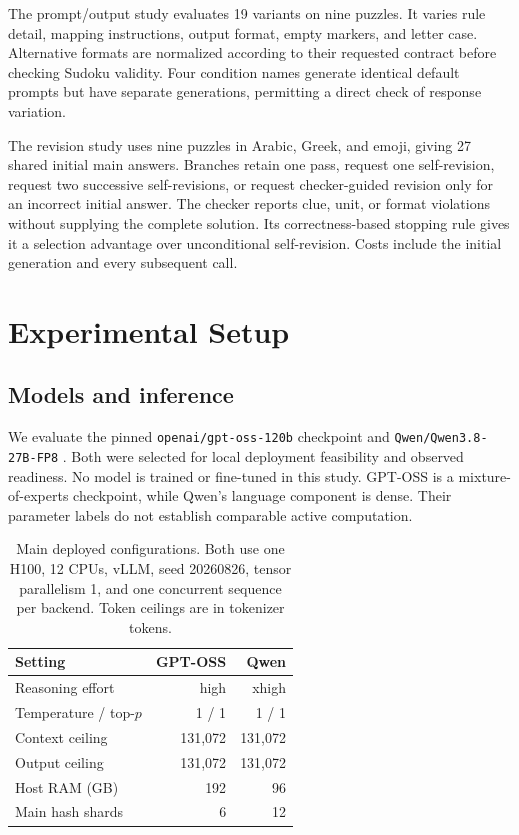 \documentclass[11pt]{article}
\begin{document}
The prompt/output study evaluates 19 variants on nine puzzles. It varies rule detail, mapping instructions, output format, empty markers, and letter case. Alternative formats are normalized according to their requested contract before checking Sudoku validity. Four condition names generate identical default prompts but have separate generations, permitting a direct check of response variation.

The revision study uses nine puzzles in Arabic, Greek, and emoji, giving 27 shared initial main answers. Branches retain one pass, request one self-revision, request two successive self-revisions, or request checker-guided revision only for an incorrect initial answer. The checker reports clue, unit, or format violations without supplying the complete solution. Its correctness-based stopping rule gives it a selection advantage over unconditional self-revision. Costs include the initial generation and every subsequent call.

\section{Experimental Setup}
\subsection{Models and inference}
We evaluate the pinned \texttt{openai/gpt-oss-120b} checkpoint \citep{openai2025gptoss} and \texttt{Qwen/Qwen3.8-27B-FP8} \citep{qwen2026card}. Both were selected for local deployment feasibility and observed readiness. No model is trained or fine-tuned in this study. GPT-OSS is a mixture-of-experts checkpoint, while Qwen's language component is dense. Their parameter labels do not establish comparable active computation.

\begin{table}[t]
\centering\small
\begin{tabular}{p{2.55cm}rr}
\toprule
Setting & GPT-OSS & Qwen\\
\midrule
Reasoning effort & high & xhigh\\
Temperature / top-$p$ & 1 / 1 & 1 / 1\\
Context ceiling & 131,072 & 131,072\\
Output ceiling & 131,072 & 131,072\\
Host RAM (GB) & 192 & 96\\
Main hash shards & 6 & 12\\
\bottomrule
\end{tabular}
\caption{Main deployed configurations. Both use one H100, 12 CPUs, vLLM, seed 20260826, tensor parallelism 1, and one concurrent sequence per backend. Token ceilings are in tokenizer tokens.}
\label{tab:settings}
\end{table}
\end{document}
